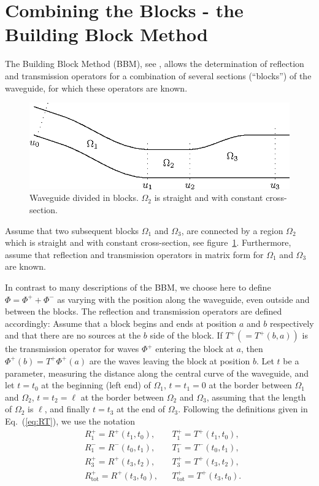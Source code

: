 \documentclass[numreferences]{kluwer}
\renewcommand{\Phi}{\varPhi}
\renewcommand{\vec}[1]{\bm{#1}}
\renewcommand{\Phi}{\varPhi}
\newcommand{\Ttot}{T^+_{\text{tot}}}
\newcommand{\Rtot}{R^+_{\text{tot}}}
\begin{document}
\section{Combining the Blocks - the Building Block Method}
\label{sec:comb-blocks-build}

The Building Block Method (BBM), see \cite{nilssonbrander1981b},
allows the determination of reflection and transmission operators for
a combination of several sections (``blocks'') of the waveguide, for
which these operators are known.  

\begin{figure}[htb]
  \centering
  \includegraphics[width=\textwidth]{BBMwg-1}
  \caption{Waveguide divided in blocks. $\Omega_2$ is straight and
    with constant cross-section.}
  \label{fig:wg4}
\end{figure}


Assume that two subsequent blocks $\Omega_1$ and $\Omega_3$, are
connected by a region $\Omega_2$ which is straight and with constant
cross-section, see figure~\ref{fig:wg4}.  Furthermore, assume that
reflection and transmission operators in matrix form for $\Omega_1$
and $\Omega_3$ are known.

In contrast to many descriptions of the BBM, we choose here to define
$\vec\Phi=\vec\Phi^++\vec\Phi^-$ as varying with the position along
the waveguide, even outside and between the blocks. The reflection and
transmission operators are defined accordingly: Assume that a block
begins and ends at position $a$ and $b$ respectively and that
there are no sources at the $b$ side of the block. If $T^+(=T^+(b,a))$
is the transmission operator for waves $\vec\Phi^+$ entering the block
at $a$, then $\vec\Phi^+(b)=T^+\vec\Phi^+(a)$ are the waves leaving
the block at position $b$. Let $t$ be a parameter, measuring the
distance along the central curve of the waveguide, and let $t=t_0$ at
the beginning (left end) of $\Omega_1$, $t=t_1=0$ at the border between
$\Omega_1$ and $\Omega_2$, $t=t_2=\ell$ at the border between $\Omega_2$
and $\Omega_3$, assuming that the length of $\Omega_2$ is $\ell$, 
 and finally $t=t_3$ at the end of
$\Omega_3$. Following the definitions given in Eq.~(\ref{eq:RT}), we
use the notation
\begin{align*}
  &R^+_1=R^+(t_1,t_0),&&T^+_1=T^+(t_1,t_0),\\
  &R^-_1=R^-(t_0,t_1),&&T^-_1=T^-(t_0,t_1),\\
  &R^+_3=R^+(t_3,t_2),&&T^+_3=T^+(t_3,t_2),\\
  &\Rtot=R^+(t_3,t_0),&&\Ttot=T^+(t_3,t_0).
\end{align*}
\end{document}
